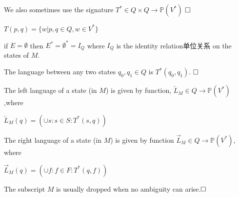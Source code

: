 \begin{remark}
	We also sometimes use the signature $T^\ast\in Q\times Q\to \mathbb{P}(V^\ast)$ $\hfill\square$
\end{remark}

\begin{note}
	$T(p,q)=\{w|p,q\in Q,w\in V^\ast\}$
\end{note}

\begin{remark}
	if $E=\emptyset$ then $E^\ast=\emptyset^\ast=I_Q$ where $I_Q$ is the identity relation单位关系 on the states of $M$.
\end{remark}

\begin{definition}
	The language between any two states $q_0,q_1\in Q$ is $T^\ast(q_0,q_1)$. $\hfill\square$
\end{definition}

\begin{definition}
	The left language of a state (in $M$) is given by function, $\overleftarrow{L}_M\in Q\to\mathbb{P}(V^\ast)$,where
	
	$\overleftarrow{L}_M(q)=(\cup s:s\in S:T^\ast(s,q))$
	
	The right language of a state (in $M$) is given by function $\overrightarrow{L}_M\in Q\to\mathbb{P}(V^\ast)$, where
	
	$\overrightarrow{L}_M(q)=(\cup f:f\in F:T^\ast(q,f))$
	
	The subscript $M$ is usually dropped when no ambiguity can arise.$\hfill\square$
\end{definition}

